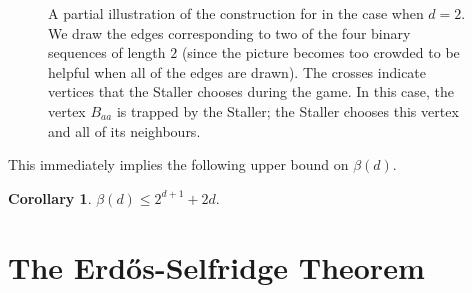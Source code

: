 \documentclass[a4paper,11pt,oneside]{scrartcl}
\theoremstyle{definition}
\newtheorem{corollary}[definition]{Corollary}
\theoremstyle{remark}
\begin{document}
\begin{figure}[ht]
    \centering

    \caption{A partial illustration of the construction for  in the case when $d=2$. We draw the edges corresponding to two of the four binary sequences of length $2$ (since the picture becomes too crowded to be helpful when all of the edges are drawn). The crosses indicate vertices that the Staller chooses during the game. In this case, the vertex $B_{aa}$ is trapped by the Staller; the Staller chooses this vertex and all of its neighbours.}
    \label{fig:g-construction}
\end{figure}
This immediately implies the following upper bound on $\beta(d)$.
\begin{corollary}\label{cor:g-bound}
    $\beta(d) \leq 2^{d+1}+2d$.
\end{corollary}


\section{The Erd\H{o}s-Selfridge Theorem}\label{section:ES}
\end{document}
